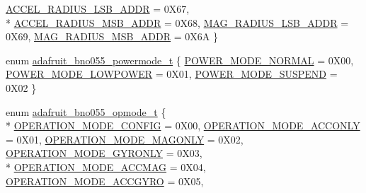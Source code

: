 \begin{DoxyCompactItemize}
\hyperlink{classAdafruit__BNO055_a37bdd791ec4916fb29933a5b78be0485a367bdee20e01c777c2e6c760523b800e}{A\+C\+C\+E\+L\+\_\+\+R\+A\+D\+I\+U\+S\+\_\+\+L\+S\+B\+\_\+\+A\+D\+DR} = 0\+X67, 
\\*
\hyperlink{classAdafruit__BNO055_a37bdd791ec4916fb29933a5b78be0485a4bce0759850a331000a48cdd0490403f}{A\+C\+C\+E\+L\+\_\+\+R\+A\+D\+I\+U\+S\+\_\+\+M\+S\+B\+\_\+\+A\+D\+DR} = 0\+X68, 
\hyperlink{classAdafruit__BNO055_a37bdd791ec4916fb29933a5b78be0485aadc1cd6166e834e0e58c496b21260e56}{M\+A\+G\+\_\+\+R\+A\+D\+I\+U\+S\+\_\+\+L\+S\+B\+\_\+\+A\+D\+DR} = 0\+X69, 
\hyperlink{classAdafruit__BNO055_a37bdd791ec4916fb29933a5b78be0485a8b021b2977145e0c7fd1c006983380d3}{M\+A\+G\+\_\+\+R\+A\+D\+I\+U\+S\+\_\+\+M\+S\+B\+\_\+\+A\+D\+DR} = 0\+X6A
 \}
\item 
enum \hyperlink{classAdafruit__BNO055_ae61dcad8ce3c5e6ffd701011cf75ca4a}{adafruit\+\_\+bno055\+\_\+powermode\+\_\+t} \{ \hyperlink{classAdafruit__BNO055_ae61dcad8ce3c5e6ffd701011cf75ca4aa460773e8dd4c41a8328260ebdd0911d6}{P\+O\+W\+E\+R\+\_\+\+M\+O\+D\+E\+\_\+\+N\+O\+R\+M\+AL} = 0\+X00, 
\hyperlink{classAdafruit__BNO055_ae61dcad8ce3c5e6ffd701011cf75ca4aa3793d3ac7ca6a2935624bbaba817eacf}{P\+O\+W\+E\+R\+\_\+\+M\+O\+D\+E\+\_\+\+L\+O\+W\+P\+O\+W\+ER} = 0\+X01, 
\hyperlink{classAdafruit__BNO055_ae61dcad8ce3c5e6ffd701011cf75ca4aae81c9f7bed51e3d51440a7c9b0c1c279}{P\+O\+W\+E\+R\+\_\+\+M\+O\+D\+E\+\_\+\+S\+U\+S\+P\+E\+ND} = 0\+X02
 \}
\item 
enum \hyperlink{classAdafruit__BNO055_a1288643630f474aba977e4b1aa34456f}{adafruit\+\_\+bno055\+\_\+opmode\+\_\+t} \{ \\*
\hyperlink{classAdafruit__BNO055_a1288643630f474aba977e4b1aa34456fa155bb4a42e3b4e5afcccc2c03826b96d}{O\+P\+E\+R\+A\+T\+I\+O\+N\+\_\+\+M\+O\+D\+E\+\_\+\+C\+O\+N\+F\+IG} = 0\+X00, 
\hyperlink{classAdafruit__BNO055_a1288643630f474aba977e4b1aa34456fa8f203109f6e08ea5bcb41ab54dd78cd4}{O\+P\+E\+R\+A\+T\+I\+O\+N\+\_\+\+M\+O\+D\+E\+\_\+\+A\+C\+C\+O\+N\+LY} = 0\+X01, 
\hyperlink{classAdafruit__BNO055_a1288643630f474aba977e4b1aa34456fad952ddf383c28de87203eaaad6b3e3e3}{O\+P\+E\+R\+A\+T\+I\+O\+N\+\_\+\+M\+O\+D\+E\+\_\+\+M\+A\+G\+O\+N\+LY} = 0\+X02, 
\hyperlink{classAdafruit__BNO055_a1288643630f474aba977e4b1aa34456fad0188a6d093269ea90aaaffa22e6ca6c}{O\+P\+E\+R\+A\+T\+I\+O\+N\+\_\+\+M\+O\+D\+E\+\_\+\+G\+Y\+R\+O\+N\+LY} = 0\+X03, 
\\*
\hyperlink{classAdafruit__BNO055_a1288643630f474aba977e4b1aa34456fae7b4432a87b21598f23c741c2d505ea4}{O\+P\+E\+R\+A\+T\+I\+O\+N\+\_\+\+M\+O\+D\+E\+\_\+\+A\+C\+C\+M\+AG} = 0\+X04, 
\hyperlink{classAdafruit__BNO055_a1288643630f474aba977e4b1aa34456faafbedaef065fd0f91f50f361b6390492}{O\+P\+E\+R\+A\+T\+I\+O\+N\+\_\+\+M\+O\+D\+E\+\_\+\+A\+C\+C\+G\+Y\+RO} = 0\+X05, 

\end{DoxyCompactItemize}
